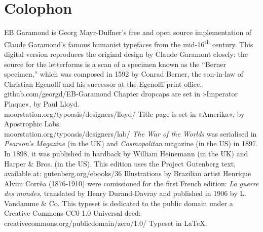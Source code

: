 \documentclass[
paper=5.5in:8.5in,
BCOR=7mm,
twoside,
DIV=calc,
11pt,
usegeometry,
chapterprefix,
headings=big]{scrbook} %
\begin{document}
\chapter*{Colophon}
\begin{center}
EB Garamond is Georg Mayr-Duffner's free and open source implementation of Claude Garamond’s famous humanist typefaces from the mid-16\textsuperscript{th} century. This digital version reproduces the original design by Claude Garamont closely: the source for the letterforms is a scan of a specimen known as the \enquote{Berner specimen,} which was composed in 1592 by Conrad Berner, the son-in-law of Christian Egenolff and his successor at the Egenolff print office.  \\github.com/georgd/EB-Garamond
\vfill
Chapter dropcaps are set in »Imperator Plaque«, by Paul Lloyd.\\moorstation.org/typoasis/designers/lloyd/
\vfill
Title page is set in »Amerika«, by Apostrophic Labs.\\moorstation.org/typoasis/designers/lab/
\vfill
\textit{The War of the Worlds} was serialised in \textit{Pearson's Magazine} (in the UK) and \textit{Cosmopolitan} magazine (in the US) in 1897. In 1898, it was published in hardback by William Heinemann (in the UK) and Harper \& Bros. (in the US). This edition uses the Project Gutenberg text, available at: gutenberg.org/ebooks/36 
\vfill
Illustrations by Brazilian artist Henrique Alvim Corrêa (1876-1910) were comissioned for the first French edition: \textit{La guerre des mondes}, translated by Henry Durand-Davray and published in 1906 by L. Vandamme \& Co.
\vfill
This typeset is dedicated to the public domain under a Creative Commons CC0 1.0 Universal deed: creativecommons.org/publicdomain/zero/1.0/
\vfill
Typeset in \LaTeX{}.
\end{center}
\thispagestyle{empty}
\end{document}

